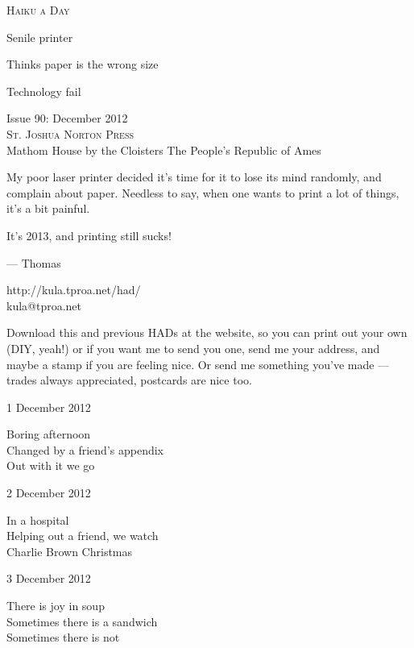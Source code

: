 \documentclass[12pt]{article}
\begin{document}
\begin{center}
{\fontsize{36}{48}\selectfont \textsc{Haiku a Day }}
\end{center}

\vspace*{3.5cm}

{\fontsize{20}{40}\selectfont 


Senile printer

Thinks paper is the wrong size

Technology fail


}

\vspace*{5.0cm}
\begin{center}
{\large{Issue 90: December 2012}} \\[5mm]
{\fontsize{8}{8}\selectfont  \textsc{ St. Joshua Norton Press }} \\[1mm]
{\fontsize{6}{6}\selectfont Mathom House by the Cloisters \textbar The People's Republic of Ames }
\end{center}


\newpage

My poor laser printer decided it's time for it to lose its mind
randomly, and complain about paper. Needless to say, when one wants
to print a lot of things, it's a bit painful. 

It's 2013, and printing still sucks!

--- Thomas

http://kula.tproa.net/had/ \\
kula@tproa.net

Download this and previous HADs at the website, so you can
print out your own (DIY, yeah!) or if you want me to send
you one, send me your address, and maybe a stamp if you
are feeling nice. Or send me something you've made ---
trades always appreciated, postcards are nice too.

\vfill

1 December 2012

Boring afternoon \\
Changed by a friend's appendix \\
Out with it we go

2 December 2012

In a hospital \\
Helping out a friend, we watch \\
Charlie Brown Christmas

3 December 2012

There is joy in soup \\
Sometimes there is a sandwich \\
Sometimes there is not
\end{document}

